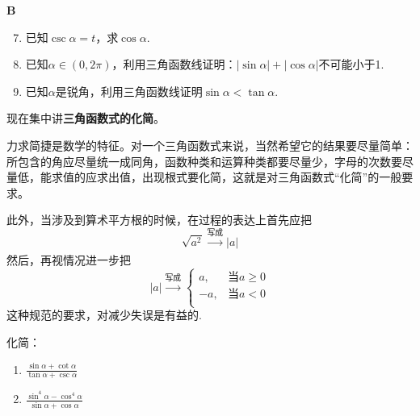\begin{center}
    \bfseries B
\end{center}

\begin{enumerate}\setcounter{enumi}{6}
    \item 已知$\csc\alpha=t$，求$\cos\alpha$.
    \item 已知$\alpha\in (0,2\pi)$，利用三角函数线证明：$|\sin\alpha|+|\cos\alpha|$不可能小于1.
    \item 已知$\alpha$是锐角，利用三角函数线证明$\sin\alpha<\tan\alpha$.
\end{enumerate}

现在集中讲\textbf{三角函数式的化简}。

力求简捷是数学的特征。对一个三角函数式来说，当然希望它的结果要尽量简单：所包含的角应尽量统一成同角，函数种类和运算种类都要尽量少，字母的次数要尽量低，能求值的应求出值，出现根式要化简，这就是对三角函数式“化简”的一般要求。

此外，当涉及到算术平方根的时候，在过程的表达上首先应把
\[\sqrt{a^2}\xrightarrow[]{\text{写成}}|a|\]
然后，再视情况进一步把
\[|a|\xrightarrow[]{\text{写成}}\begin{cases}
    a, & \text{当}a\ge 0\\
    -a, & \text{当}a< 0\\
\end{cases}\]
这种规范的要求，对减少失误是有益的.

\begin{example}
化简：\begin{multicols}{2}
\begin{enumerate}[(1)]
    \item $\frac{\sin\alpha+\cot\alpha}{\tan\alpha+\csc\alpha}$
    \item $\frac{\sin^4\alpha-\cos^4\alpha}{\sin\alpha+\cos\alpha}$
\end{enumerate}
\end{multicols}
\end{example}


